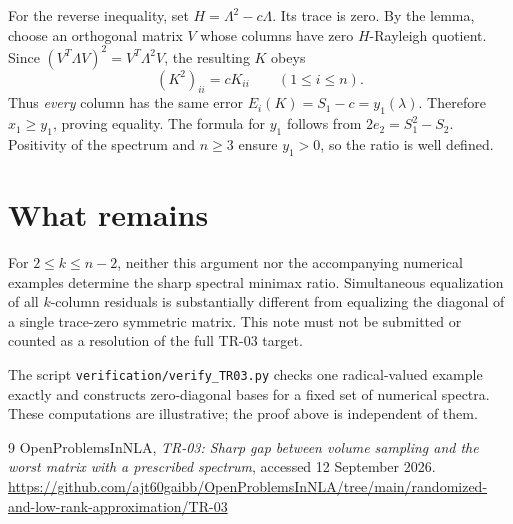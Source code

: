 \documentclass[11pt]{article}
\begin{document}
For the reverse inequality, set $H=\Lambda^2-c\Lambda$. Its trace is zero. By the lemma, choose an orthogonal matrix $V$ whose columns have zero $H$-Rayleigh quotient. Since $(V^T\Lambda V)^2=V^T\Lambda^2V$, the resulting $K$ obeys
\[
 (K^2)_{ii}=cK_{ii}\qquad(1\le i\le n).
\]
Thus \emph{every} column has the same error $E_i(K)=S_1-c=y_1(\lambda)$. Therefore $x_1\ge y_1$, proving equality. The formula for $y_1$ follows from $2e_2=S_1^2-S_2$. Positivity of the spectrum and $n\ge3$ ensure $y_1>0$, so the ratio is well defined.

\section{What remains}
For $2\le k\le n-2$, neither this argument nor the accompanying numerical examples determine the sharp spectral minimax ratio. Simultaneous equalization of all $k$-column residuals is substantially different from equalizing the diagonal of a single trace-zero symmetric matrix. This note must not be submitted or counted as a resolution of the full TR-03 target.

The script \texttt{verification/verify\_TR03.py} checks one radical-valued example exactly and constructs zero-diagonal bases for a fixed set of numerical spectra. These computations are illustrative; the proof above is independent of them.

\begin{thebibliography}{9}
 OpenProblemsInNLA, \emph{TR-03: Sharp gap between volume sampling and the worst matrix with a prescribed spectrum}, accessed 12 September 2026.\\
\url{https://github.com/ajt60gaibb/OpenProblemsInNLA/tree/main/randomized-and-low-rank-approximation/TR-03}
\end{thebibliography}
\end{document}

